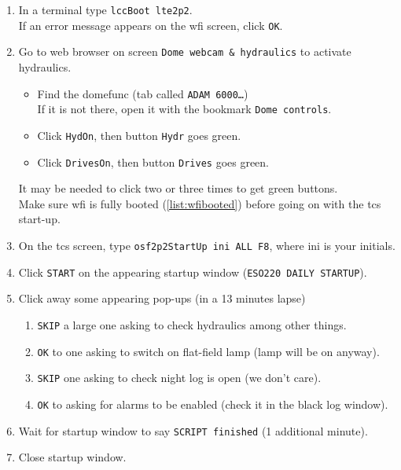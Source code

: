 \documentclass[11pt,fleqn]{book} %
\begin{document}
\begin{enumerate}
\begin{enumerate}
          \item In a terminal type \texttt{lccBoot lte2p2}.\\If an error message appears on the \gls{wfi} screen, click \texttt{OK}.
          \item Go to web browser on screen \texttt{Dome webcam \& hydraulics} to activate hydraulics. 
             \begin{itemize}
               \item Find the \gls{domefunc} (tab called \texttt{ADAM 6000…})\\
                     If it is not there, open it with the bookmark \texttt{Dome controls}.
               \item Click \texttt{HydOn}, then button \texttt{Hydr} goes green.
               \item Click \texttt{DrivesOn}, then button \texttt{Drives} goes green.
             \end{itemize}
             It may be needed to click two or three times to get green buttons.\\ Make sure \gls{wfi} is fully booted (\ref{list:wfibooted}) before going on with the \gls{tcs} start-up.
             \label{list:hydr}
          \item On the \gls{tcs} screen, type \texttt{osf2p2StartUp ini ALL F8}, where ini is your initials.\label{list:tcsboot}
          \item Click \texttt{START} on the appearing startup window (\texttt{ESO220 DAILY STARTUP}).
          \item Click away some appearing pop-ups (in a 13 minutes lapse) 
          \begin{enumerate}
             \item \texttt{SKIP} a large one asking to check hydraulics among other things.
             \item \texttt{OK} to one asking to switch on flat-field lamp (lamp will be on anyway).
             \item \texttt{SKIP} one asking to check night log is open (we don't care). 
             \item \texttt{OK} to asking for alarms to be enabled (check it in the black log window).
          \end{enumerate}
          \item Wait for startup window to say \texttt{SCRIPT finished} (1 additional minute).   
             \label{list:tcsbooted}
          \item Close startup window.

\end{enumerate}
\end{enumerate}
\end{document}
